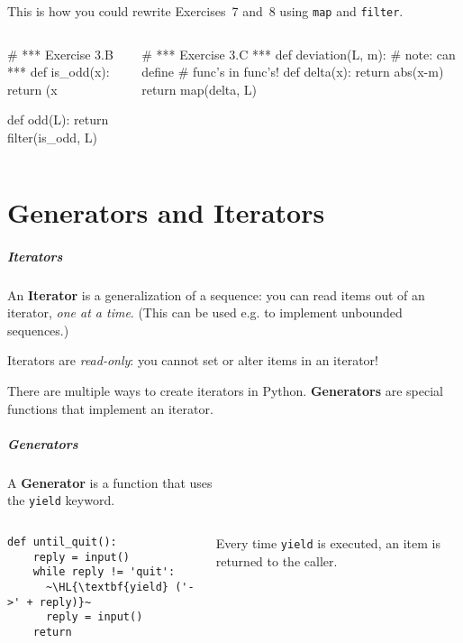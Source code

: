 \documentclass[english,serif,mathserif,xcolor=pdftex,dvipsnames,table]{beamer}
\begin{document}
\begin{frame}[fragile]
  This is how you could rewrite Exercises~7 and~8 using \texttt{map} and
  \texttt{filter}.

  \begin{columns}
    \begin{column}{0.5\linewidth}
\begin{python}
# *** Exercise 3.B ***
def is_odd(x):
  return (x %

def odd(L):
  return filter(is_odd, L)
\end{python}
\end{column}
\begin{column}{0.5\linewidth}
\begin{python}
# *** Exercise 3.C ***
def deviation(L, m):
  # note: can define
  # func's in func's!
  def delta(x):
    return abs(x-m)
  return map(delta, L)
\end{python}
\end{column}
\end{columns}
\end{frame}


\part{Generators and Iterators}
\begin{frame}
  \frametitle{Iterators}

  An \textbf{Iterator} is a generalization of a sequence: you can read
  items out of an iterator, \emph{one at a time}. (This can be used
  e.g. to implement unbounded sequences.)

  \+
  Iterators are \emph{read-only}:
  you cannot set or alter items in an iterator!


  \+
  There are multiple ways to create iterators in
  Python. \textbf{Generators} are special functions that implement an
  iterator.
\end{frame}


\begin{frame}[fragile]
  \frametitle{Generators}
  A \textbf{Generator} is a function that uses \\ the \lstinline|yield| keyword.

  \+
  \begin{columns}[c]
    \begin{column}{0.5\textwidth}
\begin{lstlisting}
def until_quit():
    reply = input()
    while reply != 'quit':
      ~\HL{\textbf{yield} ('->' + reply)}~
      reply = input()
    return
\end{lstlisting}
    \end{column}
    \begin{column}{0.4\textwidth}
      \raggedleft
      Every time \lstinline|yield| is executed, an item is returned
      to the caller.
    \end{column}
  \end{columns}
\end{frame}
\end{document}
